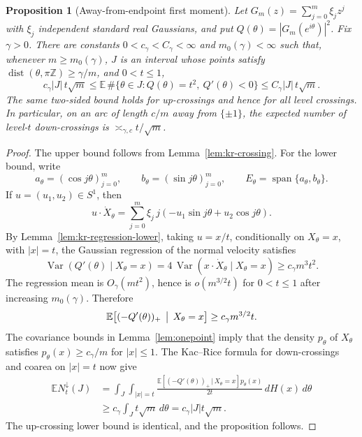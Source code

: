 \documentclass[11pt]{amsart}
\numberwithin{equation}{section}
\newtheorem{proposition}[theorem]{Proposition}
\theoremstyle{definition}
\theoremstyle{remark}
\newcommand{\Exp}{\mathbb E}
\newcommand{\dist}{\operatorname{dist}}
\begin{document}
\begin{proposition}[Away-from-endpoint first moment]\label{prop:away-firstmoment}
Let \(G_m(z)=\sum_{j=0}^m\xi_jz^j\) with \(\xi_j\) independent standard real
Gaussians, and put \(Q(\theta)=|G_m(e^{i\theta})|^2\).  Fix \(\gamma>0\).
There are constants \(0<c_\gamma<C_\gamma<\infty\) and
\(m_0(\gamma)<\infty\) such that, whenever \(m\ge m_0(\gamma)\), \(J\) is an
interval whose points satisfy \(\dist(\theta,\pi\mathbb Z)\ge \gamma/m\), and
\(0<t\le1\),
\[
 c_\gamma |J|\,t\sqrt m
 \le
 \Exp\,\#\{\theta\in J: Q(\theta)=t^2,\ Q'(\theta)<0\}
 \le
 C_\gamma |J|\,t\sqrt m .
\]
The same two-sided bound holds for up-crossings and hence for all level
crossings.  In particular, on an arc of length \(c/m\) away from
\(\{\pm1\}\), the expected number of level-\(t\) down-crossings is
\(\asymp_{\gamma,c} t/\sqrt m\).
\end{proposition}

\begin{proof}
The upper bound follows from Lemma~\ref{lem:kr-crossing}.  For the lower bound,
write
\[
a_\theta=(\cos j\theta)_{j=0}^m,\qquad
b_\theta=(\sin j\theta)_{j=0}^m,\qquad
E_\theta=\operatorname{span}\{a_\theta,b_\theta\}.
\]
If \(u=(u_1,u_2)\in S^1\), then
\[
u\cdot \dot X_\theta
=\sum_{j=0}^m \xi_j\,j(-u_1\sin j\theta+u_2\cos j\theta).
\]
By Lemma~\ref{lem:kr-regression-lower}, taking \(u=x/t\), conditionally on
\(X_\theta=x\), with \(|x|=t\), the Gaussian regression of the normal velocity
satisfies
\[
 \operatorname{Var}(Q'(\theta)\mid X_\theta=x)
 =4\,\operatorname{Var}(x\cdot\dot X_\theta\mid X_\theta=x)
 \ge c_\gamma m^3t^2 .
\]
The regression mean is \(O_\gamma(mt^2)\), hence is \(o(m^{3/2}t)\) for
\(0<t\le1\) after increasing \(m_0(\gamma)\).  Therefore
\[
 \Exp\bigl[(-Q'(\theta))_+\,\bigm|\,X_\theta=x\bigr]
 \ge c_\gamma m^{3/2}t .
\]
The covariance bounds in Lemma~\ref{lem:onepoint} imply that the density
\(p_\theta\) of \(X_\theta\) satisfies \(p_\theta(x)\ge c_\gamma/m\) for
\(|x|\le1\).  The Kac--Rice formula for down-crossings and coarea on
\(|x|=t\) now give
\[
\begin{aligned}
 \Exp N_t^\downarrow(J)
 &=\int_J\int_{|x|=t}
   \frac{\Exp[(-Q'(\theta))_+\,|\,X_\theta=x]p_\theta(x)}
        {2t}\,dH(x)\,d\theta  \\
 &\ge c_\gamma\int_J t\sqrt m\,d\theta
 = c_\gamma |J|t\sqrt m .
\end{aligned}
\]
The up-crossing lower bound is identical, and the proposition follows.
\end{proof}
\end{document}
